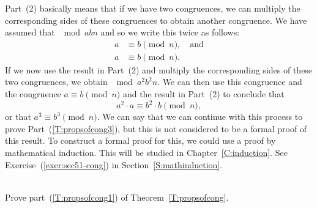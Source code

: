 \begin{myproof}
Part~(2) basically means that if we have two congruences, we can multiply the corresponding sides of these congruences to obtain another congruence.  We have assumed that $\mod{a}{b}{n}$ and so we write this twice as follows:
\begin{align*}
a &\equiv b \pmod n, \quad \text{and} \\
a &\equiv b \pmod n.
\end{align*}
If we now use the result in Part~(2) and multiply the corresponding sides of these two congruences, we obtain 
$\mod{a^2}{b^2}{n}$.
%
%
%
We can then use this congruence and the congruence 
$a \equiv b \pmod n$ and the result in Part~(2) to conclude that
\[
a^2 \cdot a \equiv b^2 \cdot b \pmod n,
\]
or that $a^3 \equiv b^3 \pmod n$.  We can say that we can continue with this process to prove Part~(\ref{T:propsofcong3}), but this is not considered to be a formal proof of this result.  To construct a formal proof for this, we could use a proof by mathematical induction.  This will be studied in Chapter~\ref{C:induction}.  See Exercise~(\ref{exer:sec51-cong}) in 
Section~\ref{S:mathinduction}.
\end{myproof}

\begin{prog} \label{pr:propsofcong} \hfill \\
Prove part~(\ref{T:propsofcong1}) of Theorem~\ref{T:propsofcong}.
\end{prog}
\hbreak

